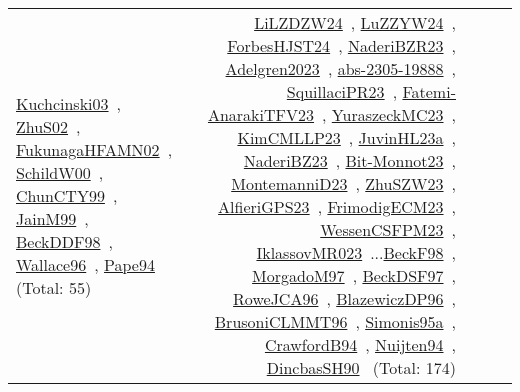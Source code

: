 {\begin{longtable}{p{3cm}r>{\raggedright\arraybackslash}p{6cm}>{\raggedright\arraybackslash}p{6cm}>{\raggedright\arraybackslash}p{8cm}}
\href{../works/Kuchcinski03.pdf}{Kuchcinski03}~\cite{Kuchcinski03}, \href{../works/ZhuS02.pdf}{ZhuS02}~\cite{ZhuS02}, \href{../works/FukunagaHFAMN02.pdf}{FukunagaHFAMN02}~\cite{FukunagaHFAMN02}, \href{../works/SchildW00.pdf}{SchildW00}~\cite{SchildW00}, \href{../works/ChunCTY99.pdf}{ChunCTY99}~\cite{ChunCTY99}, \href{../works/JainM99.pdf}{JainM99}~\cite{JainM99}, \href{../works/BeckDDF98.pdf}{BeckDDF98}~\cite{BeckDDF98}, \href{../works/Wallace96.pdf}{Wallace96}~\cite{Wallace96}, \href{../works/Pape94.pdf}{Pape94}~\cite{Pape94} (Total: 55) & \href{../works/LiLZDZW24.pdf}{LiLZDZW24}~\cite{LiLZDZW24}, \href{../works/LuZZYW24.pdf}{LuZZYW24}~\cite{LuZZYW24}, \href{../works/ForbesHJST24.pdf}{ForbesHJST24}~\cite{ForbesHJST24}, \href{../works/NaderiBZR23.pdf}{NaderiBZR23}~\cite{NaderiBZR23}, \href{../works/Adelgren2023.pdf}{Adelgren2023}~\cite{Adelgren2023}, \href{../works/abs-2305-19888.pdf}{abs-2305-19888}~\cite{abs-2305-19888}, \href{../works/SquillaciPR23.pdf}{SquillaciPR23}~\cite{SquillaciPR23}, \href{../works/Fatemi-AnarakiTFV23.pdf}{Fatemi-AnarakiTFV23}~\cite{Fatemi-AnarakiTFV23}, \href{../works/YuraszeckMC23.pdf}{YuraszeckMC23}~\cite{YuraszeckMC23}, \href{../works/KimCMLLP23.pdf}{KimCMLLP23}~\cite{KimCMLLP23}, \href{../works/JuvinHL23a.pdf}{JuvinHL23a}~\cite{JuvinHL23a}, \href{../works/NaderiBZ23.pdf}{NaderiBZ23}~\cite{NaderiBZ23}, \href{../works/Bit-Monnot23.pdf}{Bit-Monnot23}~\cite{Bit-Monnot23}, \href{../works/MontemanniD23.pdf}{MontemanniD23}~\cite{MontemanniD23}, \href{../works/ZhuSZW23.pdf}{ZhuSZW23}~\cite{ZhuSZW23}, \href{../works/AlfieriGPS23.pdf}{AlfieriGPS23}~\cite{AlfieriGPS23}, \href{../works/FrimodigECM23.pdf}{FrimodigECM23}~\cite{FrimodigECM23}, \href{../works/WessenCSFPM23.pdf}{WessenCSFPM23}~\cite{WessenCSFPM23}, \href{../works/IklassovMR023.pdf}{IklassovMR023}~\cite{IklassovMR023}...\href{../works/BeckF98.pdf}{BeckF98}~\cite{BeckF98}, \href{../works/MorgadoM97.pdf}{MorgadoM97}~\cite{MorgadoM97}, \href{../works/BeckDSF97.pdf}{BeckDSF97}~\cite{BeckDSF97}, \href{../works/RoweJCA96.pdf}{RoweJCA96}~\cite{RoweJCA96}, \href{../works/BlazewiczDP96.pdf}{BlazewiczDP96}~\cite{BlazewiczDP96}, \href{../works/BrusoniCLMMT96.pdf}{BrusoniCLMMT96}~\cite{BrusoniCLMMT96}, \href{../works/Simonis95a.pdf}{Simonis95a}~\cite{Simonis95a}, \href{../works/CrawfordB94.pdf}{CrawfordB94}~\cite{CrawfordB94}, \href{../works/Nuijten94.pdf}{Nuijten94}~\cite{Nuijten94}, \href{../works/DincbasSH90.pdf}{DincbasSH90}~\cite{DincbasSH90} (Total: 174)\\

\end{longtable}}
